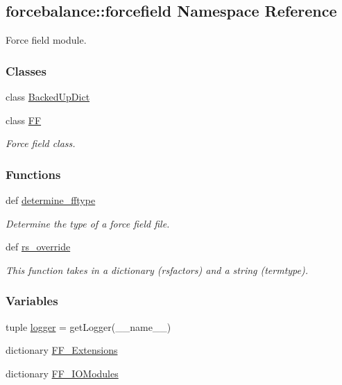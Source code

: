 \hypertarget{namespaceforcebalance_1_1forcefield}{\subsection{forcebalance\-:\-:forcefield \-Namespace \-Reference}
\label{namespaceforcebalance_1_1forcefield}
}


\-Force field module.  


\subsubsection*{\-Classes}
\begin{DoxyCompactItemize}
\item 
class \hyperlink{classforcebalance_1_1forcefield_1_1BackedUpDict}{\-Backed\-Up\-Dict}
\item 
class \hyperlink{classforcebalance_1_1forcefield_1_1FF}{\-F\-F}
\begin{DoxyCompactList}\small\item\em \-Force field class. \end{DoxyCompactList}\end{DoxyCompactItemize}
\subsubsection*{\-Functions}
\begin{DoxyCompactItemize}
\item 
def \hyperlink{namespaceforcebalance_1_1forcefield_a99c9997d5158a04be089f291bd6f99bd}{determine\-\_\-fftype}
\begin{DoxyCompactList}\small\item\em \-Determine the type of a force field file. \end{DoxyCompactList}\item 
def \hyperlink{namespaceforcebalance_1_1forcefield_ab1a855bace20dd5e45928467e2a133f1}{rs\-\_\-override}
\begin{DoxyCompactList}\small\item\em \-This function takes in a dictionary (rsfactors) and a string (termtype). \end{DoxyCompactList}\end{DoxyCompactItemize}
\subsubsection*{\-Variables}
\begin{DoxyCompactItemize}
\item 
tuple \hyperlink{namespaceforcebalance_1_1forcefield_acc6d19b93081a5db0b60419be8a27471}{logger} = get\-Logger(\-\_\-\-\_\-name\-\_\-\-\_\-)
\item 
dictionary \hyperlink{namespaceforcebalance_1_1forcefield_a877cd53359cedaee26cad7323cbdd60c}{\-F\-F\-\_\-\-Extensions}
\item 
dictionary \hyperlink{namespaceforcebalance_1_1forcefield_a7e159bd71671c11d9327e46f2ac01483}{\-F\-F\-\_\-\-I\-O\-Modules}
\end{DoxyCompactItemize}


